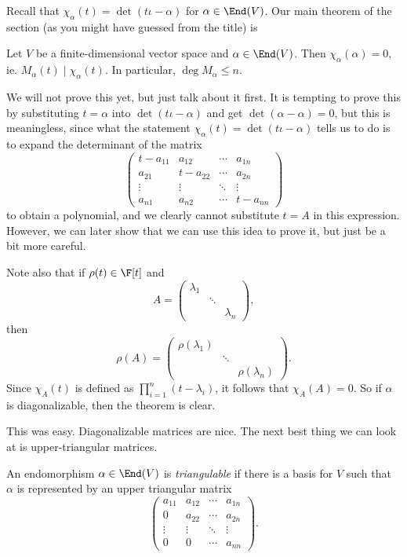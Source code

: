 \documentclass[a4paper]{article}
\begin{document}
Recall that $\chi_\alpha(t) = \det (t\iota - \alpha)$ for $\alpha \in \End(V)$. Our main theorem of the section (as you might have guessed from the title) is
\begin{thm}
  Let $V$ be a finite-dimensional vector space and $\alpha \in \End(V)$. Then $\chi_\alpha(\alpha) = 0$, ie. $M_\alpha(t) \mid \chi_\alpha(t)$. In particular, $\deg M_\alpha \leq n$.
\end{thm}
We will not prove this yet, but just talk about it first. It is tempting to prove this by substituting $t = \alpha$ into $\det(t\iota - \alpha)$ and get $\det (\alpha - \alpha) = 0$, but this is meaningless, since what the statement $\chi_\alpha(t) = \det (t\iota - \alpha)$ tells us to do is to expand the determinant of the matrix
\[
  \begin{pmatrix}
    t - a_{11} & a_{12} & \cdots & a_{1n}\\
    a_{21} & t - a_{22} & \cdots & a_{2n}\\
    \vdots & \vdots & \ddots & \vdots\\
    a_{n1} & a_{n2} & \cdots & t - a_{nn}
  \end{pmatrix}
\]
to obtain a polynomial, and we clearly cannot substitute $t = A$ in this expression. However, we can later show that we can use this idea to prove it, but just be a bit more careful.

Note also that if $\rho(t) \in \F[t]$ and
\[
  A =
  \begin{pmatrix}
    \lambda_1 &\\
    & \ddots\\
    & & \lambda_n
  \end{pmatrix},
\]
then
\[
  \rho(A) =
  \begin{pmatrix}
    \rho(\lambda_1) &\\
    & \ddots\\
    & & \rho(\lambda_n)
  \end{pmatrix}.
\]
Since $\chi_A(t)$ is defined as $\prod_{i = 1}^n (t - \lambda_i)$, it follows that $\chi_A(A) = 0$. So if $\alpha$ is diagonalizable, then the theorem is clear.

This was easy. Diagonalizable matrices are nice. The next best thing we can look at is upper-triangular matrices.
\begin{defi}[Triangulable]
  An endomorphism $\alpha \in \End(V)$ is \emph{triangulable} if there is a basis for $V$ such that $\alpha$ is represented by an upper triangular matrix
  \[
    \begin{pmatrix}
      a_{11} & a_{12} & \cdots & a_{1n}\\
      0 & a_{22} & \cdots & a_{2n}\\
      \vdots & \vdots & \ddots & \vdots\\
      0 & 0 & \cdots & a_{nn}
    \end{pmatrix}.
  \]
\end{defi}
\end{document}
